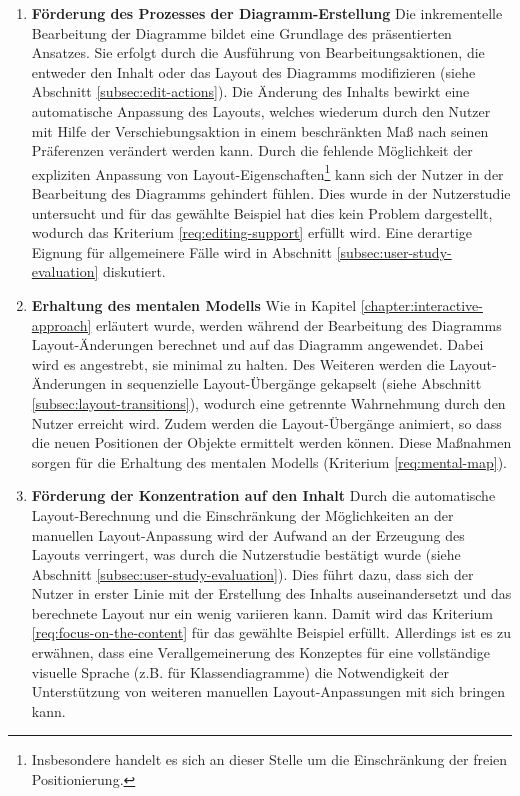 \begin{enumerate}[label={K.\arabic*}]
\item
\label{eval:editing-support}
\textbf{Förderung des Prozesses der Diagramm-Erstellung}
Die inkrementelle Bearbeitung der Diagramme bildet eine Grundlage des präsentierten Ansatzes. Sie erfolgt durch die Ausführung von Bearbeitungsaktionen, die entweder den Inhalt oder das Layout des Diagramms modifizieren (siehe Abschnitt \ref{subsec:edit-actions}). Die Änderung des Inhalts bewirkt eine automatische Anpassung des Layouts, welches wiederum durch den Nutzer mit Hilfe der Verschiebungsaktion in einem beschränkten Maß nach seinen Präferenzen verändert werden kann. Durch die fehlende Möglichkeit der expliziten Anpassung von Layout-Eigenschaften\footnote{Insbesondere handelt es sich an dieser Stelle um die Einschränkung der freien Positionierung.} kann sich der Nutzer in der Bearbeitung des Diagramms gehindert fühlen. Dies wurde in der Nutzerstudie untersucht und für das gewählte Beispiel hat dies kein Problem dargestellt, wodurch das Kriterium \ref{req:editing-support} erfüllt wird. Eine derartige Eignung für allgemeinere Fälle wird in Abschnitt \ref{subsec:user-study-evaluation} diskutiert.

\newpage

\item
\label{eval:mental-map}
\textbf{Erhaltung des mentalen Modells}
Wie in Kapitel \ref{chapter:interactive-approach} erläutert wurde, werden während der Bearbeitung des Diagramms Layout-Änderungen berechnet und auf das Diagramm angewendet. Dabei wird es angestrebt, sie minimal zu halten. Des Weiteren werden die Layout-Änderungen in sequenzielle Layout-Übergänge gekapselt (siehe Abschnitt \ref{subsec:layout-transitions}), wodurch eine getrennte Wahrnehmung durch den Nutzer erreicht wird. Zudem werden die Layout-Übergänge animiert, so dass die neuen Positionen der Objekte ermittelt werden können. Diese Maßnahmen sorgen für die Erhaltung des mentalen Modells (Kriterium \ref{req:mental-map}).

\item
\label{eval:focus-on-the-content}
\textbf{Förderung der Konzentration auf den Inhalt}
Durch die automatische Layout-Be\-rech\-nung und die Einschränkung der Möglichkeiten an der manuellen Layout-Anpassung wird der Aufwand an der Erzeugung des Layouts verringert, was durch die Nutzerstudie bestätigt wurde (siehe Abschnitt \ref{subsec:user-study-evaluation}). Dies führt dazu, dass sich der Nutzer in erster Linie mit der Erstellung des Inhalts auseinandersetzt und das berechnete Layout nur ein wenig variieren kann. Damit wird das Kriterium \ref{req:focus-on-the-content} für das gewählte Beispiel erfüllt. Allerdings ist es zu erwähnen, dass eine Verallgemeinerung des Konzeptes für eine vollständige visuelle Sprache (z.B. für Klassendiagramme) die Notwendigkeit der Unterstützung von weiteren manuellen Layout-Anpassungen mit sich bringen kann.


\end{enumerate}
